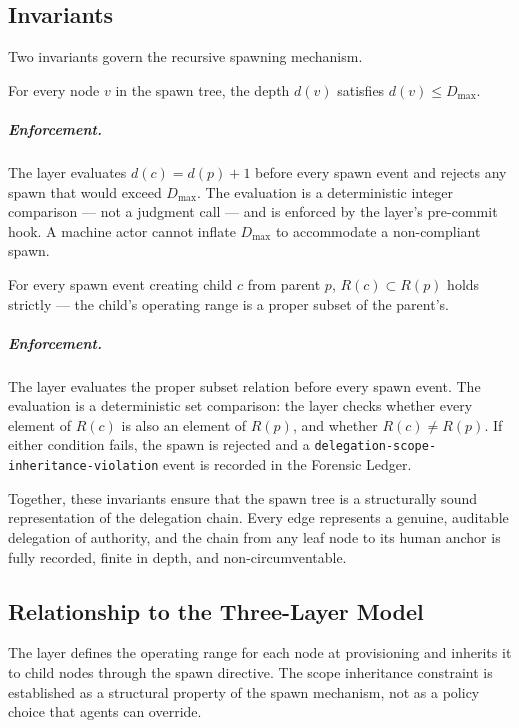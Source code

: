 \subsection{Invariants}\label{sec:spawn-invariants}

Two invariants govern the recursive spawning mechanism.

\begin{invariant}\label{inv:hierarchy-finiteness}
For every node $v$ in the spawn tree, the depth $d(v)$ satisfies $d(v) \leq D_{\max}$.
\end{invariant}

\subparagraph{Enforcement.} The \bounds{} layer evaluates $d(c) = d(p) + 1$ before every spawn event and rejects any spawn that would exceed $D_{\max}$. The evaluation is a deterministic integer comparison — not a judgment call — and is enforced by the \fact{} layer's pre-commit hook. A machine actor cannot inflate $D_{\max}$ to accommodate a non-compliant spawn.

\begin{invariant}\label{inv:scope-inheritance}
For every spawn event creating child $c$ from parent $p$, $R(c) \subset R(p)$ holds strictly — the child's operating range is a proper subset of the parent's.
\end{invariant}

\subparagraph{Enforcement.} The \bounds{} layer evaluates the proper subset relation before every spawn event. The evaluation is a deterministic set comparison: the \bounds{} layer checks whether every element of $R(c)$ is also an element of $R(p)$, and whether $R(c) \neq R(p)$. If either condition fails, the spawn is rejected and a \texttt{delegation-scope-inheritance-violation} event is recorded in the Forensic Ledger.

Together, these invariants ensure that the spawn tree is a structurally sound representation of the delegation chain. Every edge represents a genuine, auditable delegation of authority, and the chain from any leaf node to its human anchor is fully recorded, finite in depth, and non-circumventable.

\subsection{Relationship to the Three-Layer Model}\label{sec:spawn-three-layer}

The \purpose{} layer defines the operating range for each node at provisioning and inherits it to child nodes through the spawn directive. The scope inheritance constraint is established as a structural property of the spawn mechanism, not as a policy choice that agents can override.

